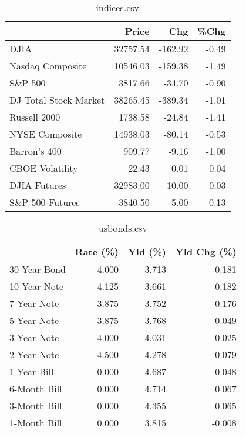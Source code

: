 \documentclass{article}%
\begin{document}
%


\begin{table}[htbp]%
\caption{indices.csv}%
\centering%
\begin{adjustbox}{width=1\textwidth}%
\begin{tabular}{lrrr}
\toprule
                      &    Price &     Chg &  \%Chg \\
\midrule
                 DJIA & 32757.54 & -162.92 & -0.49 \\
     Nasdaq Composite & 10546.03 & -159.38 & -1.49 \\
              S\&P 500 &  3817.66 &  -34.70 & -0.90 \\
DJ Total Stock Market & 38265.45 & -389.34 & -1.01 \\
         Russell 2000 &  1738.58 &  -24.84 & -1.41 \\
       NYSE Composite & 14938.03 &  -80.14 & -0.53 \\
         Barron's 400 &   909.77 &   -9.16 & -1.00 \\
      CBOE Volatility &    22.43 &    0.01 &  0.04 \\
         DJIA Futures & 32983.00 &   10.00 &  0.03 \\
      S\&P 500 Futures &  3840.50 &   -5.00 & -0.13 \\
\bottomrule
\end{tabular}
%
\end{adjustbox}%
\end{table}

%


\begin{table}[htbp]%
\caption{usbonds.csv}%
\centering%
\begin{adjustbox}{width=1\textwidth}%
\begin{tabular}{lrrr}
\toprule
             &  Rate (\%) &  Yld (\%) &  Yld Chg (\%) \\
\midrule
30-Year Bond &     4.000 &    3.713 &        0.181 \\
10-Year Note &     4.125 &    3.661 &        0.182 \\
 7-Year Note &     3.875 &    3.752 &        0.176 \\
 5-Year Note &     3.875 &    3.768 &        0.049 \\
 3-Year Note &     4.000 &    4.031 &        0.025 \\
 2-Year Note &     4.500 &    4.278 &        0.079 \\
 1-Year Bill &     0.000 &    4.687 &        0.048 \\
6-Month Bill &     0.000 &    4.714 &        0.067 \\
3-Month Bill &     0.000 &    4.355 &        0.065 \\
1-Month Bill &     0.000 &    3.815 &       -0.008 \\
\bottomrule
\end{tabular}
%
\end{adjustbox}%
\end{table}
\end{document}
